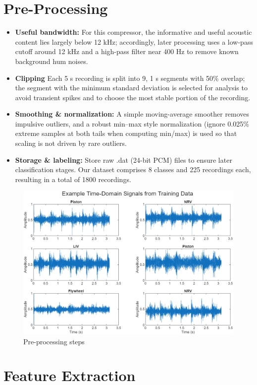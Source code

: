 \documentclass[12pt,a4paper]{article}
\begin{document}
\begin{multicols}{2}
\section{Pre-Processing}
\label{sec:preprocess}
\begin{itemize}
  \item \textbf{Useful bandwidth:} For this compressor, the informative and useful acoustic content lies largely below 12 kHz; accordingly, later processing uses a low-pass cutoff around 12 kHz and a high-pass filter near 400 Hz to remove known background hum noises.
  \item \textbf{Clipping} Each 5 s recording is split into 9, 1 s segments with 50\% overlap; the segment with the minimum standard deviation is selected for analysis to avoid transient spikes and to choose the most stable portion of the recording.
  \item \textbf{Smoothing \& normalization:} A simple moving-average smoother removes impulsive outliers, and a robust min–max style normalization (ignore 0.025\% extreme samples at both tails when computing min/max) is used so that scaling is not driven by rare outliers.
  \item \textbf{Storage \& labeling:} Store raw .dat (24-bit PCM) files to ensure later classification stages. Our dataset comprises 8 classes and 225 recordings each, resulting in a total of 1800 recordings. 
\end{itemize}
\begin{figure}[H]
    \centering
    \includegraphics[width=1\linewidth]{Diagrams/preprocessing.png}
    \caption{Pre-processing steps}
    \label{fig:preprocessing steps}
\end{figure}
\section{Feature Extraction}

\end{multicols}
\end{document}

